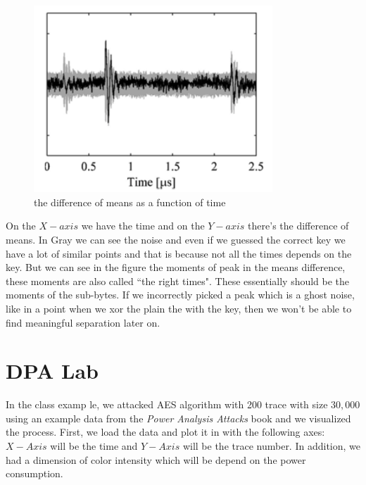 \begin{figure}[!ht]
    \centering
    \includegraphics[width=0.8\textwidth]{images/Lecture6/meansDiffFigure.png}
    \caption{the difference of means as a function of time}
    \label{fig:meansDiffFigure}
\end{figure}

On the $X-axis$ we have the time and on the $Y-axis$ there's the difference of
means. In Gray we can see the noise and even if we guessed the correct key we
have a lot of similar points and that is because not all the times depends on
the key. But we can see in the figure the moments of peak in the means
difference, these moments are also called ``the right times". These essentially
should be the moments of the sub-bytes. If we incorrectly picked a peak which is
a ghost noise, like in a point when we xor the plain the with the key, then we
won't be able to find meaningful separation later on.

\section{DPA Lab}
In the class examp le, we attacked AES algorithm with 200 trace with size
$30,000$ using an example data from the \textit{Power Analysis Attacks} book and
we visualized the process. First, we load the data and plot it in
 with the following axes: $X-Axis$ will be the time and
$Y-Axis$ will be the trace number. In addition, we had a dimension of color
intensity which will be depend on the power consumption.

